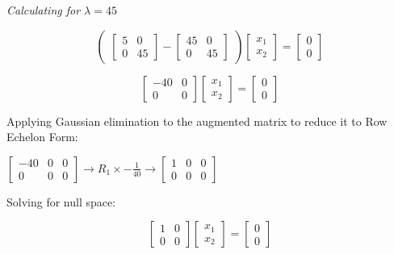 \documentclass[a4paper]{report}
\begin{document}
\textit{Calculating for $\lambda=45$}

\[\begin{pmatrix}\begin{bmatrix}
    5&0\\0&45
\end{bmatrix}- \begin{bmatrix}
    45&0\\0&45
\end{bmatrix} \end{pmatrix} \begin{bmatrix}
    x_1\\x_2
\end{bmatrix}=\begin{bmatrix}
    0\\0
\end{bmatrix}\]

\[ \begin{bmatrix}
    -40&0\\0&0
\end{bmatrix} \begin{bmatrix}
    x_1\\x_2
\end{bmatrix}=\begin{bmatrix}
    0\\0
\end{bmatrix}\]

\vspace{5mm}

Applying Gaussian elimination to the augmented matrix to reduce it to Row Echelon Form:

\vspace{5mm}

$\left [ \begin{array}{cc|c}
-40&0&0\\0&0&0
\end{array} \right ] \rightarrow R_1\times-\frac{1}{40} \rightarrow \left [\begin{array}{cc|cc}
     1&0&0  \\
     0&0&0 
\end{array} \right]$



\newpage Solving for null space:

\[ \begin{bmatrix}
    1&0\\0&0
\end{bmatrix} \begin{bmatrix}
    x_1\\x_2
\end{bmatrix}=\begin{bmatrix}
    0\\0
\end{bmatrix}\]
\end{document}
